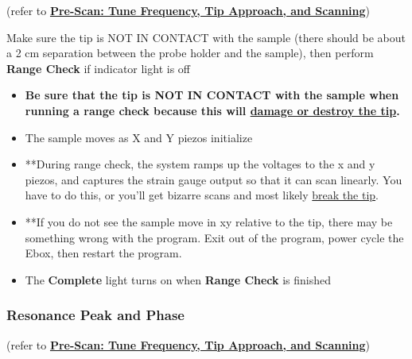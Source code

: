 \documentclass{../lab}
\begin{document}
(refer to \href{http://experimentationlab.berkeley.edu/sites/default/files/prescan\_final2.mp4}{\textbf{Pre-Scan: Tune Frequency, Tip Approach, and Scanning}})

Make sure the tip is NOT IN CONTACT with the sample (there should be about a 2 cm separation between the probe holder and the sample), then perform \textbf{Range Check} if indicator light is off
\begin{itemize}
    \item \textbf{Be sure that the tip is NOT IN CONTACT with the sample when running a range check because this will \hyperref[subsec:BrokenTip]{damage or destroy the tip}.}
    
    \item The sample moves as X and Y piezos initialize
    
    \item **During range check, the system ramps up the voltages to the x and y piezos, and captures the strain gauge output so that it can scan linearly. You have to do this, or you'll get bizarre scans and most likely \hyperref[subsec:BrokenTip]{break the tip}.
    
    \item **If you do not see the sample move in xy relative to the tip, there may be something wrong with the program.  Exit out of the program, power cycle the Ebox, then restart the program.
    
    \item The \textbf{Complete} light turns on when \textbf{Range Check} is finished
\end{itemize}

\subsubsection{Resonance Peak and Phase}

(refer to \href{http://experimentationlab.berkeley.edu/sites/default/files/prescan\_final2.mp4}{\textbf{Pre-Scan: Tune Frequency, Tip Approach, and Scanning}})
\end{document}
